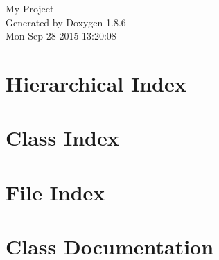 \documentclass[twoside]{book}
\newcommand{\clearemptydoublepage}{%
  \newpage{\pagestyle{empty}\cleardoublepage}%
}
\begin{document}
\hypersetup{pageanchor=false}
\begin{titlepage}
\vspace*{7cm}
\begin{center}%
{\Large My Project }\\
\vspace*{1cm}
{\large Generated by Doxygen 1.8.6}\\
\vspace*{0.5cm}
{\small Mon Sep 28 2015 13:20:08}\\
\end{center}
\end{titlepage}
\clearemptydoublepage
\tableofcontents
\clearemptydoublepage
{}
\hypersetup{pageanchor=true}

\chapter{Hierarchical Index}

\chapter{Class Index}

\chapter{File Index}

\chapter{Class Documentation}


























\end{document}
